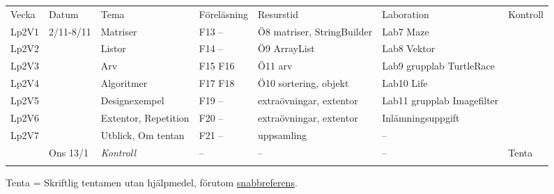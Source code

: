\begin{longtable}[c]{@{}lllllll@{}}
\toprule\addlinespace
Vecka & Datum & Tema & Föreläsning & Resurstid & Laboration & Kontroll
\\\addlinespace
\midrule\endhead
Lp2V1 & 2/11-8/11 & Matriser & F13 -- & Ö8 matriser, StringBuilder &
Lab7 Maze &
\\\addlinespace
Lp2V2 & & Listor & F14 -- & Ö9 ArrayList & Lab8 Vektor &
\\\addlinespace
Lp2V3 & & Arv & F15 F16 & Ö11 arv & Lab9 grupplab TurtleRace &
\\\addlinespace
Lp2V4 & & Algoritmer & F17 F18 & Ö10 sortering, objekt & Lab10 Life &
\\\addlinespace
Lp2V5 & & Designexempel & F19 -- & extraövningar, extentor & Lab11
grupplab Imagefilter &
\\\addlinespace
Lp2V6 & & Extentor, Repetition & F20 -- & extraövningar, extentor &
Inlämningsuppgift &
\\\addlinespace
Lp2V7 & & Utblick, Om tentan & F21 -- & uppsamling & -- &
\\\addlinespace
& Ons 13/1 & \emph{Kontroll} & -- & -- & -- & Tenta
\\\addlinespace
\bottomrule
\end{longtable}

Tenta = Skriftlig tentamen utan hjälpmedel, förutom
\href{http://cs.lth.se/eda016/javaref}{snabbreferens}.
